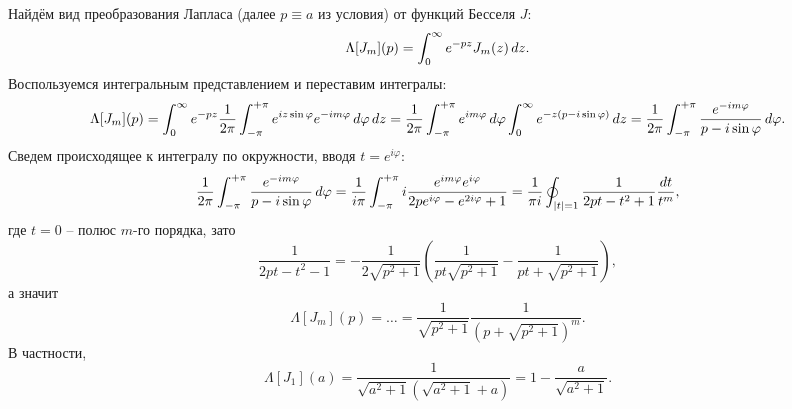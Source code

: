 Найдём вид преобразования Лапласа (далее $p \equiv a$ из условия) от функций Бесселя $J$:
\begin{equation*}
    \Lambda[J_m] (p) = \int_{0}^{\infty} e^{- p z} J_m (z) \, d z.
\end{equation*}
Воспользуемся интегральным представлением и переставим интегралы:
\begin{equation*}
    \Lambda[J_m] (p) =  \int_{0}^{\infty} e^{-p z} \frac{1}{2\pi} \int_{-\pi}^{+\pi} e^{i z \sin \varphi} e^{- i m \varphi} 
    \, d \varphi \, d z = 
    \frac{1}{2\pi} \int_{-\pi}^{+\pi} e^{i m \varphi} \, d \varphi \int_{0}^{\infty} 
    e^{-z(p - i \sin \varphi)} \, d z = \frac{1}{2\pi} \int_{-\pi}^{+\pi} \frac{e^{- i m \varphi}}{p - i \sin \varphi} \, d \varphi.
\end{equation*}
Сведем происходящее к интегралу по окружности, вводя $t = e^{i \varphi}$:
\begin{equation*}
    \frac{1}{2\pi} \int_{-\pi}^{+\pi} \frac{e^{- i m \varphi}}{p - i \sin \varphi} \, d \varphi = 
    \frac{1}{i \pi} \int_{-\pi}^{+\pi} i \frac{e^{i m \varphi} e^{i \varphi}}{2 p e^{i \varphi} - e^{2 i \varphi} + 1} = \frac{1}{\pi i} \oint_{|t|=1} \frac{1}{2 p t - t^2 + 1}\frac{d t}{t^m},
\end{equation*}
где $t = 0$ -- полюс $m$-го порядка,  зато
\begin{equation*}
    \frac{1}{2 p t - t^2 - 1} =  - \frac{1}{2 \sqrt{p^2 +1 }} \left(
        \frac{1}{pt \sqrt{p^2+1}} - \frac{1}{pt + \sqrt{p^2 + 1}}
    \right),
\end{equation*}
а значит
\begin{equation}
    \Lambda[J_m] (p) = \ldots = \frac{1}{\sqrt{p^2 + 1}} \frac{1}{(p + \sqrt{p^2+1})^m}.
\end{equation}
В частности,
\begin{equation*}
    \Lambda[J_1] (a) = \frac{1}{\sqrt{a^2+1} \left(\sqrt{a^2+1}+a\right)} = 1-\frac{a}{\sqrt{a^2+1}}.
\end{equation*}